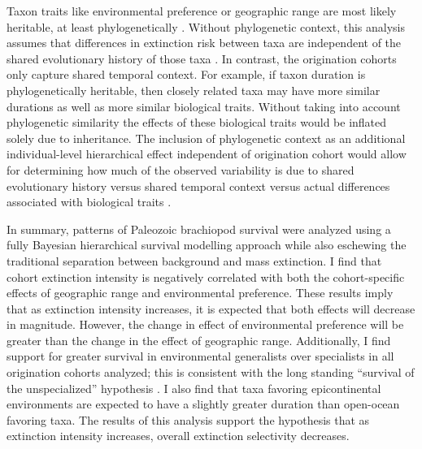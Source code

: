 \documentclass{article}
\begin{document}
Taxon traits like environmental preference or geographic range \citep{Jablonski1987,Hunt2005b} are most likely heritable, at least phylogenetically \citep{Lynch1991,Housworth2004}. Without phylogenetic context, this analysis assumes that differences in extinction risk between taxa are independent of the shared evolutionary history of those  taxa \citep{Felsenstein1985b}. In contrast, the origination cohorts only capture shared temporal context. For example, if taxon duration is phylogenetically heritable, then closely related taxa may have more similar durations as well as more similar biological traits. Without taking into account phylogenetic similarity the effects of these biological traits would be inflated solely due to inheritance. The inclusion of phylogenetic context as an additional individual-level hierarchical effect independent of origination cohort would allow for determining how much of the observed variability is due to shared evolutionary history versus shared temporal context versus actual differences associated with biological traits \citep{Harnik2014,Smits2015}. 

In summary, patterns of Paleozoic brachiopod survival were analyzed using a fully Bayesian hierarchical survival modelling approach while also eschewing the traditional separation between background and mass extinction. I find that cohort extinction intensity is negatively correlated with both the cohort-specific effects of geographic range and environmental preference. These results imply that as extinction intensity increases, it is expected that both effects will decrease in magnitude. However, the change in effect of environmental preference will be greater than the change in the effect of geographic range. Additionally, I find support for greater survival in environmental generalists over specialists in all origination cohorts analyzed; this is consistent with the long standing ``survival of the unspecialized'' hypothesis \citep{Liow2004a,Liow2007b,Simpson1944,Simpson1953,Smits2015,Nurnberg2015,Nurnberg2013a, Baumiller1993}. I also find that taxa favoring epicontinental environments are expected to have a slightly greater duration than open-ocean favoring taxa. The results of this analysis support the hypothesis that as extinction intensity increases, overall extinction selectivity decreases.
\end{document}
